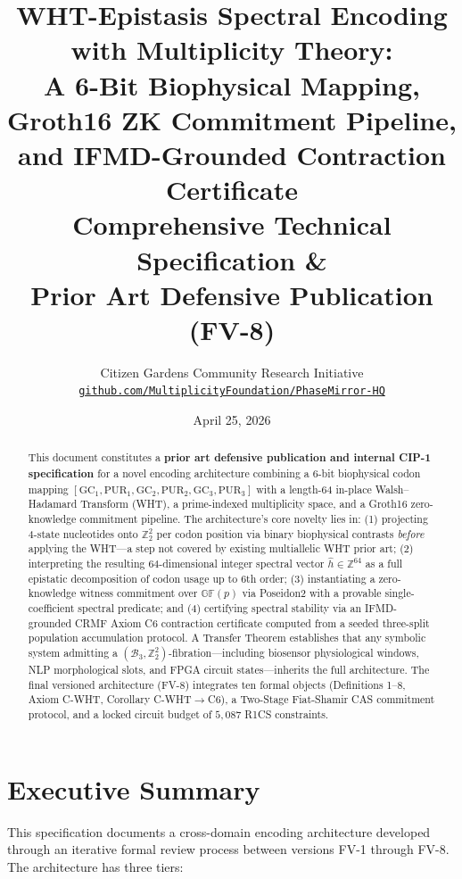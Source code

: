 \documentclass[12pt,letterpaper]{article}
\title{
  \vspace{-0.5in}
  {\Large\bfseries WHT-Epistasis Spectral Encoding with Multiplicity Theory:}\\[6pt]
  {\large A 6-Bit Biophysical Mapping, Groth16 ZK Commitment Pipeline,\\
  and IFMD-Grounded Contraction Certificate}\\[12pt]
  {\normalsize\textbf{Comprehensive Technical Specification \&\\
  Prior Art Defensive Publication (FV-8)}}\\[6pt]

}
\author{
  Citizen Gardens Community Research Initiative\\
  \href{https://github.com/MultiplicityFoundation/PhaseMirror-HQ}%
       {\texttt{github.com/MultiplicityFoundation/PhaseMirror-HQ}}
}
\date{April 25, 2026}
\theoremstyle{definition}
\theoremstyle{plain}
\theoremstyle{remark}
\newcommand{\hhat}{\hat{h}}
\newcommand{\GFp}{\mathbb{GF}(p)}
\begin{document}
\maketitle
\thispagestyle{fancy}

\begin{abstract}
This document constitutes a \textbf{prior art defensive publication and internal CIP-1 specification} for a novel encoding architecture combining a 6-bit biophysical codon mapping $[\mathrm{GC}_1, \mathrm{PUR}_1, \mathrm{GC}_2, \mathrm{PUR}_2, \mathrm{GC}_3, \mathrm{PUR}_3]$ with a length-64 in-place Walsh--Hadamard Transform (WHT), a prime-indexed multiplicity space, and a Groth16 zero-knowledge commitment pipeline. The architecture's core novelty lies in: (1) projecting 4-state nucleotides onto $\mathbb{Z}_2^2$ per codon position via binary biophysical contrasts \emph{before} applying the WHT---a step not covered by existing multiallelic WHT prior art; (2) interpreting the resulting 64-dimensional integer spectral vector $\hhat \in \mathbb{Z}^{64}$ as a full epistatic decomposition of codon usage up to 6th order; (3) instantiating a zero-knowledge witness commitment over $\GFp$ via Poseidon2 with a provable single-coefficient spectral predicate; and (4) certifying spectral stability via an IFMD-grounded CRMF Axiom C6 contraction certificate computed from a seeded three-split population accumulation protocol. A Transfer Theorem establishes that any symbolic system admitting a $(\mathcal{B}_3, \mathbb{Z}_2^2)$-fibration---including biosensor physiological windows, NLP morphological slots, and FPGA circuit states---inherits the full architecture. The final versioned architecture (FV-8) integrates ten formal objects (Definitions 1--8, Axiom C-WHT, Corollary C-WHT$\to$C6), a Two-Stage Fiat-Shamir CAS commitment protocol, and a locked circuit budget of $5{,}087$ R1CS constraints.
\end{abstract}
\newpage
\tableofcontents

\section{Executive Summary}

This specification documents a cross-domain encoding architecture developed through an iterative formal review process between versions FV-1 through FV-8. The architecture has three tiers:
\end{document}
